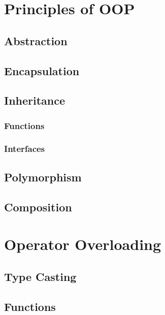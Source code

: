 \documentclass{article}
\title{\thistitle}
\author{\me}
\date{\today}
\begin{document}
\maketitle
\tableofcontents
\pagebreak

\section{Principles of OOP}

\subsection{Abstraction}

\subsection{Encapsulation}

\subsection{Inheritance}

\subsubsection{ Functions}

\subsubsection{Interfaces}

\subsection{Polymorphism}

\subsection{Composition}

\section{Operator Overloading}

\subsection{Type Casting}

\subsection{ Functions}
\end{document}
